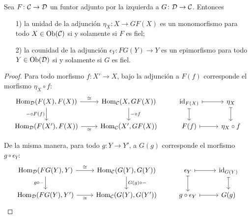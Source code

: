 \documentclass{article}
\numberwithin{equation}{section}
\theoremstyle{definition}
\begin{document}
\begin{proposicion}
  Sea $F\colon \mathcal{C} \to \mathcal{D}$ un funtor adjunto por la izquierda a
  $G\colon \mathcal{D} \to \mathcal{C}$. Entonces

  \begin{enumerate}
  \item[1)] la unidad de la adjunción $\eta_X\colon X\to GF (X)$ es un
    monomorfismo para todo $X\in \operatorname{Ob} (\mathcal{C})$ si y solamente si $F$ es
    fiel;

  \item[2)] la counidad de la adjunción $\epsilon_Y\colon FG (Y)\to Y$ es un
    epimorfismo para todo $Y\in \operatorname{Ob} (\mathcal{D})$ si y solamente si $G$ es fiel.
  \end{enumerate}

  \begin{proof}
    Para todo morfismo $f\colon X'\to X$, bajo la adjunción a $F (f)$
    corresponde el morfismo $\eta_X\circ f$:
    \[ \begin{tikzcd}
        \Hom_\vcateg{D} (F (X), F (X))\ar{r}{\isom}\ar{d}[swap]{-\circ F (f)} & \Hom_\vcateg{C} (X, GF (X))\ar{d}{-\circ f} & \id{F(X)}\ar[|->]{d}\ar[|->]{r} & \eta_X\ar[|->]{d} \\
        \Hom_\vcateg{D} (F (X'), F (X))\ar{r}[swap]{\isom} & \Hom_\vcateg{C} (X', GF (X)) & F (f) \ar[|->]{r} & \eta_X\circ f
      \end{tikzcd} \]

    De la misma manera, para todo $g\colon Y\to Y'$, a $G (g)$ corresponde el
    morfismo $g\circ \epsilon_Y$:
    \[ \begin{tikzcd}
        \Hom_\vcateg{D} (FG (Y), Y)\ar{r}{\isom}\ar{d}[swap]{g\circ -} & \Hom_\vcateg{C} (G(Y), G (Y))\ar{d}{G (g)\circ -} & \epsilon_Y\ar[|->]{d}\ar[|->]{r} & \id{G (Y)}\ar[|->]{d} \\
        \Hom_\vcateg{D} (FG (Y), Y')\ar{r}[swap]{\isom} & \Hom_\vcateg{C} (G (Y), G (Y')) & g\circ \epsilon_Y \ar[|->]{r} & G (g)
      \end{tikzcd} \]


\end{proof}
\end{proposicion}
\end{document}
